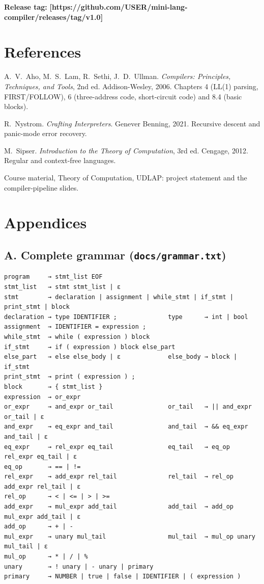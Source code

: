 \documentclass[11pt,letterpaper]{article}
\newcommand{\fillin}[1]{\textcolor{fill}{\textbf{[#1]}}}   %
\newcommand{\code}[1]{\texttt{#1}}
\begin{document}
\textbf{Release tag:} \fillin{https://github.com/USER/mini-lang-compiler/releases/tag/v1.0}

\section{References}
\begin{enumerate}[label={[\arabic*]}]
  \item A.~V.~Aho, M.~S.~Lam, R.~Sethi, J.~D.~Ullman. \emph{Compilers: Principles, Techniques, and Tools}, 2nd ed. Addison-Wesley, 2006. Chapters 4 (LL(1) parsing, FIRST/FOLLOW), 6 (three-address code, short-circuit code) and 8.4 (basic blocks).
  \item R.~Nystrom. \emph{Crafting Interpreters}. Genever Benning, 2021. Recursive descent and panic-mode error recovery.
  \item M.~Sipser. \emph{Introduction to the Theory of Computation}, 3rd ed. Cengage, 2012. Regular and context-free languages.
  \item Course material, Theory of Computation, UDLAP: project statement and the compiler-pipeline slides.
\end{enumerate}

\section{Appendices}

\subsection*{A. Complete grammar (\code{docs/grammar.txt})}
\begin{Verbatim}
program     → stmt_list EOF
stmt_list   → stmt stmt_list | ε
stmt        → declaration | assignment | while_stmt | if_stmt | print_stmt | block
declaration → type IDENTIFIER ;              type      → int | bool
assignment  → IDENTIFIER = expression ;
while_stmt  → while ( expression ) block
if_stmt     → if ( expression ) block else_part
else_part   → else else_body | ε             else_body → block | if_stmt
print_stmt  → print ( expression ) ;
block       → { stmt_list }
expression  → or_expr
or_expr     → and_expr or_tail               or_tail   → || and_expr or_tail | ε
and_expr    → eq_expr and_tail               and_tail  → && eq_expr and_tail | ε
eq_expr     → rel_expr eq_tail               eq_tail   → eq_op rel_expr eq_tail | ε
eq_op       → == | !=
rel_expr    → add_expr rel_tail              rel_tail  → rel_op add_expr rel_tail | ε
rel_op      → < | <= | > | >=
add_expr    → mul_expr add_tail              add_tail  → add_op mul_expr add_tail | ε
add_op      → + | -
mul_expr    → unary mul_tail                 mul_tail  → mul_op unary mul_tail | ε
mul_op      → * | / | %
unary       → ! unary | - unary | primary
primary     → NUMBER | true | false | IDENTIFIER | ( expression )
\end{Verbatim}
\end{document}
